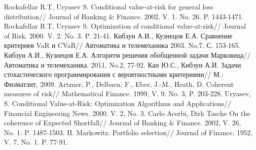 \documentclass[14pt,a4paper]{article}
\theoremstyle{plain}
\theoremstyle{definition}
\begin{document}
\begin{thebibliography}{1}
 Rockafellar R.T, Uryasev S. Conditional value-at-risk for general loss distribution// Journal of Banking $\&$ Finance. 2002. V. 1. No. 26. P. 1443-1471.
 Rockafellar R.T, Uryasev S. Optimization of conditional value-at-risk// Journal of Risk. 2000. V. 2. No. 3. P. 21-41.
 Кибзун А.И., Кузнецов Е.А. Сравнение критериев VaR и CVaR// Автоматика и телемеханика 2003. No.7. С. 153-165.
 Кибзун А.И., Кузнецов Е.А. Алгоритм решения обобщенной задачи Марковица//  Автоматика и телемеханика. 2011, No.2, 77-92.
 Кан Ю.С., Кибзун А.И. Задачи стохастического программирования с вероятностными критериями// М.: Физматлит, 2009.
 Artzner, P., Delbaen, F., Eber, J.-M., Heath, D. Coherent measures of risk// Mathematical Finance. 1999, V. 9. No. 3, P. 203-228.
 Uryasev, S. Conditional Value-at-Risk: Optimization Algorithms and Applications// Financial Engineering News. 2000. V. 2, No. 3.
 Carlo Acerbi, Dirk Tasche On the coherence of Expected Shortfall// Journal of Banking $\&$ Finance. 2002, V. 26, No. 1. P. 1487-1503.
  H. Markowitz.  Portfolio selection// Journal of Finance. 1952, V. 7, No. 1. P. 77-91.
\end{thebibliography}
\end{document}
